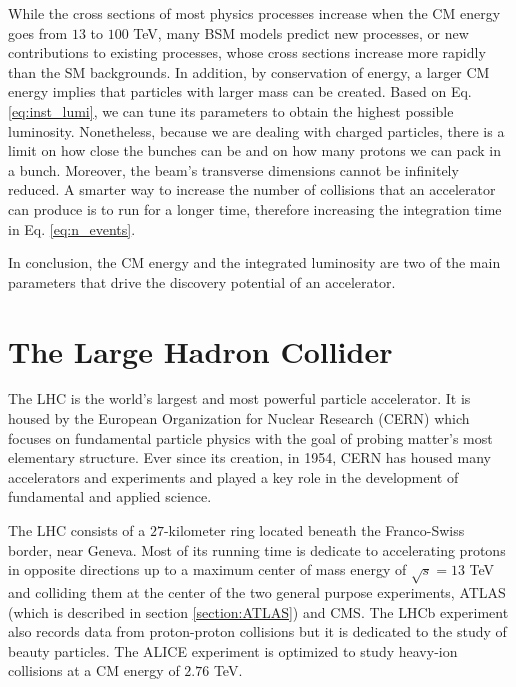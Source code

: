 While the cross sections of most physics processes increase when the CM energy goes from $13$ to $100$ TeV, many BSM models predict new processes, or new contributions to existing processes, whose cross sections increase more rapidly than the SM backgrounds. In addition, by conservation of energy, a larger CM energy implies that particles with larger mass can be created. Based on Eq. \ref{eq:inst_lumi}, we can tune its parameters to obtain the highest possible luminosity. Nonetheless, because we are dealing with charged particles, there is a limit on how close the bunches can be and on how many protons we can pack in a bunch. Moreover, the beam's transverse dimensions cannot be infinitely reduced. A smarter way to increase the number of collisions that an accelerator can produce is to run for a longer time, therefore increasing the integration time in Eq. \ref{eq:n_events}. 

In conclusion, the CM energy and the integrated luminosity are two of the main parameters that drive the discovery potential of an accelerator. 


\section{The Large Hadron Collider}
\label{section:LHC}

%


The LHC is the world's largest and most powerful particle accelerator. It is housed by the European Organization for Nuclear Research (CERN) which focuses on fundamental particle physics with the goal of probing matter's most elementary structure. Ever since its creation, in 1954, CERN has housed many accelerators and experiments and played a key role in the development of fundamental and applied science.


The LHC consists of a $27$-kilometer ring located beneath the Franco-Swiss border, near Geneva. Most of its running time is dedicate to accelerating protons in opposite directions up to a maximum center of mass energy of $\sqrt{s}=13$ TeV and colliding them at the center of the two general purpose experiments, ATLAS (which is described in section \ref{section:ATLAS}) and CMS. The LHCb experiment also records data from proton-proton collisions but it is dedicated to the study of beauty particles. The ALICE experiment is optimized to study heavy-ion collisions at a CM energy of $2.76$ TeV.

